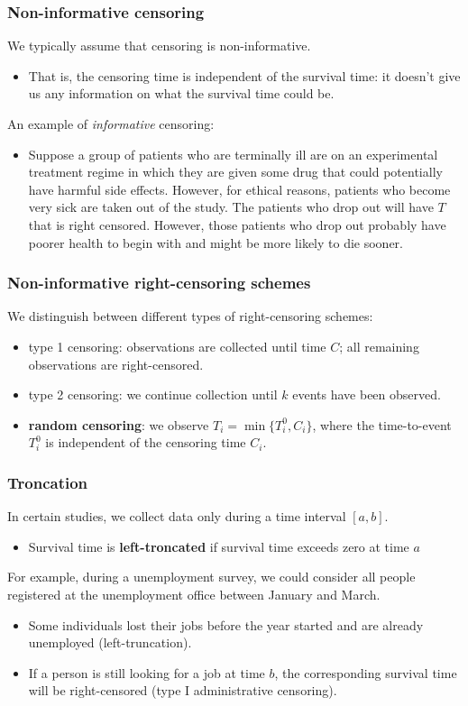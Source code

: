 \documentclass{beamer}
\begin{document}
\begin{frame}
\frametitle{Non-informative censoring}
We typically assume that censoring is \alert{non-informative}. 
\begin{itemize}
\vp \vp
\item That is, the censoring time is independent of the survival time: it doesn't give us any information on what the survival time could be.
\end{itemize}
An example of \emph{informative} censoring:
\begin{itemize}
\vp \vp
\item Suppose a group of patients who are terminally ill are on an experimental treatment regime in which they are given some drug that could potentially have harmful side effects. However, for ethical reasons, patients who become very sick are taken out of the study. The patients who drop out will have $T$ that is right censored. However, those patients who drop out probably have poorer health to begin with and might be more likely to die sooner.
\end{itemize}

\end{frame}
\begin{frame}
 \frametitle{Non-informative right-censoring schemes}
 We distinguish between different types of right-censoring schemes:
 \begin{itemize}
  \item type 1 censoring: observations are collected until time $C$; all remaining observations are right-censored.
  \item type 2 censoring: we continue collection until $k$ events have been observed.
  \item \textbf{random censoring}: we observe $T_i = \min\{T_i^0, C_i\}$, where the time-to-event $T_i^0$ is independent of the censoring time $C_i$.
 \end{itemize}

\end{frame}
\begin{frame}
 \frametitle{Troncation}
 In certain studies, we collect data only during a time interval $[a, b]$. 
 \begin{itemize} 
 \item Survival time is \textbf{left-troncated} if survival time exceeds zero at time $a$
\end{itemize}
For example, during a unemployment survey, we could consider all people registered at the unemployment office between January and March. 
\begin{itemize} 
\item Some individuals lost their jobs before the year started and are already unemployed (left-truncation).
 \item If a person is still looking for a job at time $b$, the corresponding survival time will be right-censored (type I administrative censoring).
\end{itemize}
\end{frame}
\end{document}
